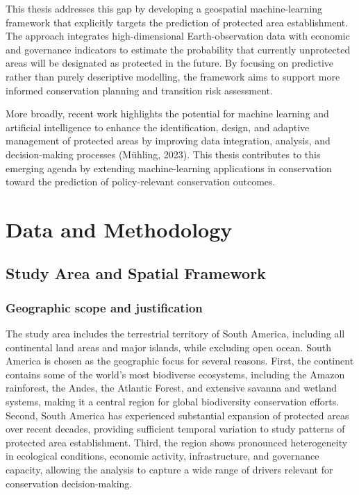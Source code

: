 \documentclass[12pt]{article}
\theoremstyle{break} %
\begin{document}
This thesis addresses this gap by developing a geospatial machine-learning framework that explicitly targets the prediction of protected area establishment. The approach integrates high-dimensional Earth-observation data with economic and governance indicators to estimate the probability that currently unprotected areas will be designated as protected in the future. By focusing on predictive rather than purely descriptive modelling, the framework aims to support more informed conservation planning and transition risk assessment.

More broadly, recent work highlights the potential for machine learning and artificial intelligence to enhance the identification, design, and adaptive management of protected areas by improving data integration, analysis, and decision-making processes (Mühling, 2023). This thesis contributes to this emerging agenda by extending machine-learning applications in conservation toward the prediction of policy-relevant conservation outcomes.
\newpage

\section{Data and Methodology}\label{data-and-methodology}

\subsection{Study Area and Spatial Framework} \label{Study-Area-and-Spatial-Framework}

\subsubsection{Geographic scope and justification} \label{Geographic scope and justification}

The study area includes the terrestrial territory of South America, including all continental land areas and major islands, while excluding open ocean. South America is chosen as the geographic focus for several reasons. First, the continent contains some of the world’s most biodiverse ecosystems, including the Amazon rainforest, the Andes, the Atlantic Forest, and extensive savanna and wetland systems, making it a central region for global biodiversity conservation efforts. Second, South America has experienced substantial expansion of protected areas over recent decades, providing sufficient temporal variation to study patterns of protected area establishment. Third, the region shows pronounced heterogeneity in ecological conditions, economic activity, infrastructure, and governance capacity, allowing the analysis to capture a wide range of drivers relevant for conservation decision-making.
\end{document}
